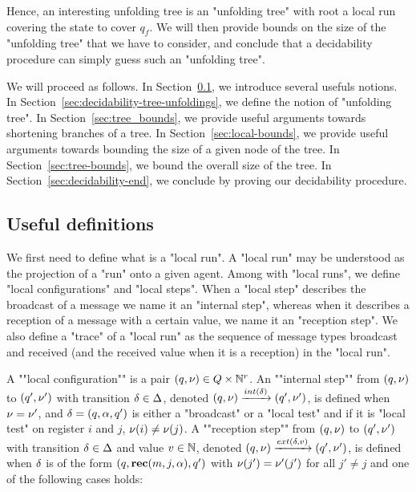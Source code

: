 Hence, an interesting unfolding tree is an "unfolding tree" with root a local run covering the state to cover $q_f$.
We will then provide bounds on the size of the "unfolding tree" that we have to consider, and conclude that a decidability procedure can simply guess such an "unfolding tree". 

We will proceed as follows. In Section~\ref{sec:decidability-defs}, we introduce several usefuls notions. In Section~\ref{sec:decidability-tree-unfoldings}, we define the notion of "unfolding tree". In Section~\ref{sec:tree_bounds}, we  provide useful arguments towards shortening branches of a tree. In Section~\ref{sec:local-bounds}, we provide useful arguments towards bounding the size of a given node of the tree. In Section~\ref{sec:tree-bounds}, we bound the overall size of the tree. In Section~\ref{sec:decidability-end}, we conclude by proving our decidability procedure. 


\subsection{Useful definitions}
\label{sec:decidability-defs}

We first need to define what is a "local run". A "local run" may be understood as the projection of a "run" onto a given agent. Among with "local runs", we define "local configurations" and "local steps".  When a "local step" describes the broadcast of a message we name it an "internal step", whereas when it describes a reception of a message with a certain value, we name it an "reception step". We also define a "trace" of a "local run" as the sequence of message types broadcast and received (and the received value when it is a reception) in the "local run".
	
\AP A ""local configuration"" is a pair $(q, \nu) \in Q \times \mathbb{N}^r$.  
\AP An ""internal step"" from $(q,\nu)$ to $(q',\nu')$ with transition $\delta \in \Delta$, denoted $(q,\localdata) \intstep{\atrans} (q',\localdata')$, is defined when $\nu = \nu'$, and $\delta =(q, \alpha, q')$ is either a "broadcast" or a "local test" and if it is "local test" on register $i$ and $j$, $\nu(i) \ne \nu(j)$.  
\AP A ""reception step"" from $(q,\nu)$ to $(q',\nu')$ with transition $\delta \in \Delta$ and value $v \in \mathbb{N}$, denoted $(q,\localdata) \extbr{\atrans}{\aval} (q',\localdata')$, is defined when $\delta$ is of the form $(q,\textbf{rec}(m, j, \alpha),q')$ with $\nu(j') = \nu'(j')$ for all $j' \neq j$ and one of the following cases holds:
	
